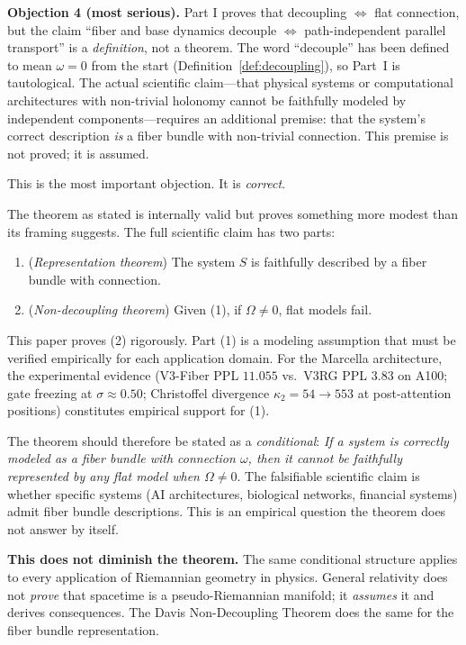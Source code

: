 \documentclass[12pt]{amsart}
\theoremstyle{plain}
\theoremstyle{definition}
\begin{document}
\begin{auditbox}
\textbf{Objection 4 (most serious).} Part I proves that decoupling
$\Leftrightarrow$ flat connection, but the claim ``fiber and base dynamics
decouple $\Leftrightarrow$ path-independent parallel transport'' is a
\emph{definition}, not a theorem. The word ``decouple'' has been defined to
mean $\omega = 0$ from the start (Definition~\ref{def:decoupling}), so Part~I
is tautological. The actual scientific claim---that physical systems or
computational architectures with non-trivial holonomy cannot be faithfully
modeled by independent components---requires an additional premise: that the
system's correct description \emph{is} a fiber bundle with non-trivial
connection. This premise is not proved; it is assumed.
\end{auditbox}

\begin{replybox}
This is the most important objection. It is \emph{correct}.

The theorem as stated is internally valid but proves something more
modest than its framing suggests. The full scientific claim has two parts:
\begin{enumerate}
  \item (\emph{Representation theorem}) The system $S$ is faithfully
    described by a fiber bundle with connection.
  \item (\emph{Non-decoupling theorem}) Given (1), if $\Omega \neq 0$, flat
    models fail.
\end{enumerate}
This paper proves (2) rigorously. Part (1) is a modeling assumption that
must be verified empirically for each application domain. For the Marcella
architecture, the experimental evidence (V3-Fiber PPL $11.055$ vs.\
V3RG PPL $3.83$ on A100; gate freezing at $\sigma \approx 0.50$;
Christoffel divergence $\kappa_2 = 54 \to 553$ at post-attention
positions) constitutes empirical support for (1).

The theorem should therefore be stated as a \emph{conditional}: 
\emph{If a system is correctly modeled as a fiber bundle with connection
$\omega$, then it cannot be faithfully represented by any flat model when
$\Omega \neq 0$}. The falsifiable scientific claim is whether specific
systems (AI architectures, biological networks, financial systems)
admit fiber bundle descriptions. This is an empirical question the theorem
does not answer by itself.

\textbf{This does not diminish the theorem.} The same conditional structure
applies to every application of Riemannian geometry in physics. General
relativity does not \emph{prove} that spacetime is a pseudo-Riemannian
manifold; it \emph{assumes} it and derives consequences. The Davis
Non-Decoupling Theorem does the same for the fiber bundle representation.
\end{replybox}
\end{document}
